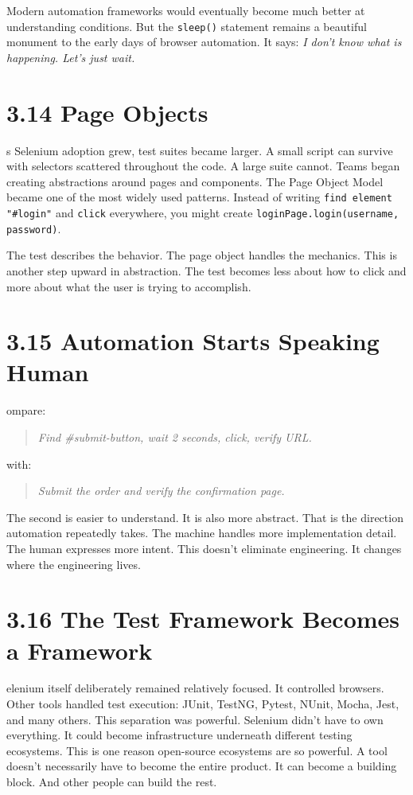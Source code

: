 \documentclass[11pt, a4paper, openany]{book}
\newcommand{\initialcap}[1]{{\fontfamily{lmss}\selectfont\huge\textbf{#1}}}
\begin{document}
Modern automation frameworks would eventually become much better at understanding conditions. But the \texttt{sleep()} statement remains a beautiful monument to the early days of browser automation. It says: \textit{I don't know what is happening. Let's just wait.}

\section{3.14 Page Objects}
\noindent \initialcap{A}s Selenium adoption grew, test suites became larger. A small script can survive with selectors scattered throughout the code. A large suite cannot. Teams began creating abstractions around pages and components. The Page Object Model became one of the most widely used patterns. Instead of writing \texttt{find element "\#login"} and \texttt{click} everywhere, you might create \texttt{loginPage.login(username, password)}. 

The test describes the behavior. The page object handles the mechanics. This is another step upward in abstraction. The test becomes less about how to click and more about what the user is trying to accomplish.

\section{3.15 Automation Starts Speaking Human}
\noindent \initialcap{C}ompare:
\begin{quote}
\textit{Find \#submit-button, wait 2 seconds, click, verify URL.}
\end{quote}
with:
\begin{quote}
\textit{Submit the order and verify the confirmation page.}
\end{quote}
The second is easier to understand. It is also more abstract. That is the direction automation repeatedly takes. The machine handles more implementation detail. The human expresses more intent. This doesn't eliminate engineering. It changes where the engineering lives.

\section{3.16 The Test Framework Becomes a Framework}
\noindent \initialcap{S}elenium itself deliberately remained relatively focused. It controlled browsers. Other tools handled test execution: JUnit, TestNG, Pytest, NUnit, Mocha, Jest, and many others. This separation was powerful. Selenium didn't have to own everything. It could become infrastructure underneath different testing ecosystems. This is one reason open-source ecosystems are so powerful. A tool doesn't necessarily have to become the entire product. It can become a building block. And other people can build the rest.
\end{document}
